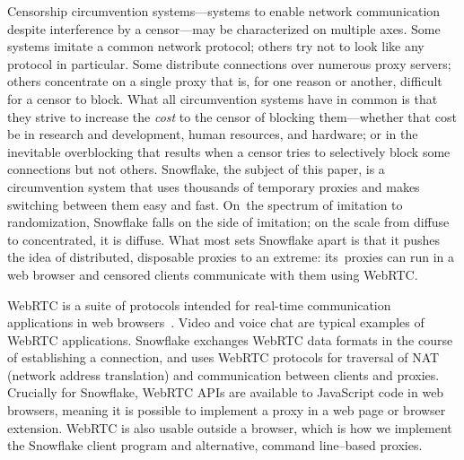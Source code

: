 \documentclass[letterpaper,twocolumn]{article}
\begin{document}
Censorship circumvention systems---systems
to enable network communication
despite interference by a censor---may
be characterized on multiple axes.
Some systems imitate a common network protocol;
others try
not to look like any protocol in particular.
Some distribute connections over numerous proxy servers;
others concentrate on a single proxy
that is, for one reason or another, difficult for a censor to block.
What all circumvention systems have in common
is that they strive to increase the \emph{cost}
to the censor of blocking them---whether that cost be in
research and development, human resources, and hardware;
or in the inevitable overblocking that results
when a censor tries to selectively block
some connections but not others.
Snowflake, the subject of this paper,
is a circumvention system that
uses thousands of temporary proxies
and makes switching between them easy and fast.
On~the spectrum of imitation to randomization,
Snowflake falls on the side of imitation;
on the scale from diffuse to concentrated, it is diffuse.
What most sets Snowflake apart is that
it pushes the idea of distributed, disposable
proxies to an extreme:
its~proxies can run in a web browser
and censored clients communicate with them using WebRTC.

WebRTC is a suite of protocols
intended for real-time communication applications
in web browsers~\cite{rfc8825}.
Video and voice chat are typical examples
of WebRTC applications.
Snowflake exchanges WebRTC data formats
in the course of establishing a connection,
and uses WebRTC protocols for traversal of NAT (network address translation)
and communication between clients and proxies.
Crucially for Snowflake, WebRTC APIs
are available to JavaScript code in web browsers,
meaning it is possible to implement a proxy
in a web page or browser extension.
WebRTC is also usable outside a browser,
which is how we implement the Snowflake client program
and alternative, command line--based proxies.
\end{document}
